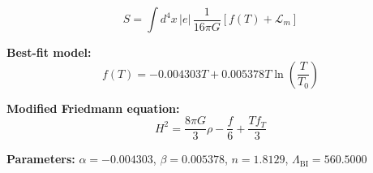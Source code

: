 
\begin{equation}
  S = \int d^4x \, |e| \, \frac{1}{16\pi G} \left[ f(T) + \mathcal{L}_m \right]
\end{equation}

\textbf{Best-fit model:}
\begin{equation}
  f(T) = -0.004303 T + 0.005378 T \ln\!\left(\frac{T}{T_0}\right)
\end{equation}

\textbf{Modified Friedmann equation:}
\begin{equation}
  H^2 = \frac{8\pi G}{3} \rho - \frac{f}{6} + \frac{T f_T}{3}
\end{equation}

\textbf{Parameters:}
$\alpha = -0.004303$, \quad
$\beta = 0.005378$, \quad
$n = 1.8129$, \quad
$\Lambda_{\text{BI}} = 560.5000$